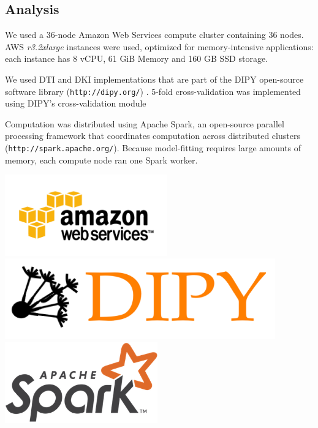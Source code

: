 \documentclass[a0, landscape]{a0poster}
\begin{document}
\begin{multicols}{3}
\color{DarkSlateGray}
\subsection*{Analysis}

We used a 36-node Amazon Web Services compute cluster containing 36 nodes. AWS
\emph{r3.2xlarge} instances were used, optimized for memory-intensive
applications: each instance has 8 vCPU, 61 GiB Memory and 160 GB SSD storage.

\noindent We used DTI and DKI implementations that are part of the DIPY
open-source software library (\texttt{http://dipy.org/}) \cite{Garyfallidis2014FrontNeuroinf}. 5-fold cross-validation was implemented using DIPY's cross-validation module \cite{Rokem2015PLoS}

\noindent Computation was distributed using Apache Spark, an open-source
parallel processing framework that coordinates computation across distributed
clusters (\texttt{http://spark.apache.org/}). Because model-fitting requires
large amounts of memory, each compute node ran one Spark worker.

\hspace{2 mm}
\includegraphics[height=3.5cm]{AWS.png}
\hspace{2 mm}
\includegraphics[height=3.5cm]{dipy-logo.png}
\hspace{2 mm}
\includegraphics[height=3.5cm]{spark-logo.png}
\hspace{2 mm}



\end{multicols}
\end{document}

